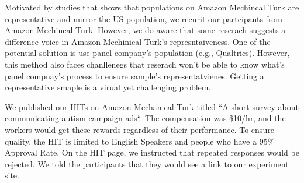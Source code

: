 Motivated by studies that shows that populations on Amazon Mechincal Turk are representative and mirror the US population, we recurit our partcipants from Amazon Mechincal Turk. However, we do aware that some reserach suggests a difference voice in Amazon Mechinical Turk's represntaiveness. One of the potential solution is use panel company's population (e.g., Qualtrics). However, this method also faces chanllenegs that reserach won't be able to know what's panel compnay's process to ensure sample's representatvienes. Getting a representative smaple is a virual yet challenging problem. 


We published our HITs on Amazon Mechanical Turk titled ``A short survey about communicating autism campaign ads``. The compensation was \$10/hr, and the workers would get these rewards regardless of their performance. To ensure quality, the HIT is limited to English Speakers and people who have a 95\% Approval Rate. On the HIT page, we instructed that repeated responses would be rejected. We told the participants that they would see a link to our experiment site. 
